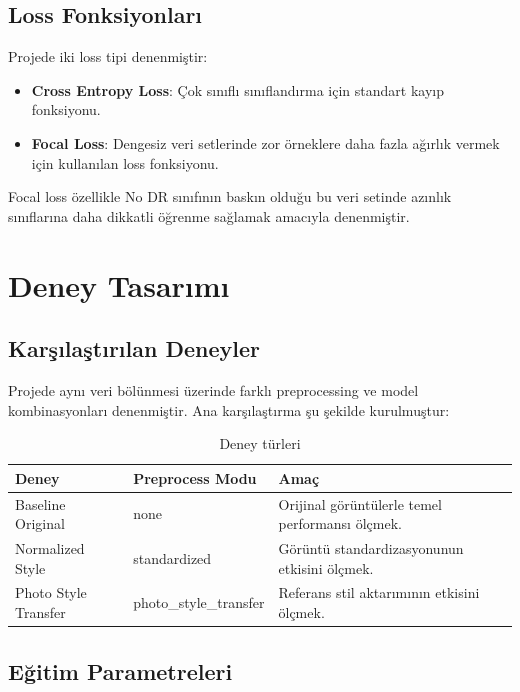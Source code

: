 \documentclass[12pt,a4paper]{article}
\begin{document}
\subsection{Loss Fonksiyonları}

Projede iki loss tipi denenmiştir:

\begin{itemize}
    \item \textbf{Cross Entropy Loss}: Çok sınıflı sınıflandırma için standart kayıp fonksiyonu.
    \item \textbf{Focal Loss}: Dengesiz veri setlerinde zor örneklere daha fazla ağırlık vermek için kullanılan loss fonksiyonu.
\end{itemize}

Focal loss özellikle No DR sınıfının baskın olduğu bu veri setinde azınlık sınıflarına daha dikkatli öğrenme sağlamak amacıyla denenmiştir.



\section{Deney Tasarımı}

\subsection{Karşılaştırılan Deneyler}

Projede aynı veri bölünmesi üzerinde farklı preprocessing ve model kombinasyonları denenmiştir. Ana karşılaştırma şu şekilde kurulmuştur:

\begin{table}[H]
\centering
\caption{Deney türleri}
\begin{tabular}{lll}
\toprule
\textbf{Deney} & \textbf{Preprocess Modu} & \textbf{Amaç} \\
\midrule
Baseline Original & none & Orijinal görüntülerle temel performansı ölçmek. \\
Normalized Style & standardized & Görüntü standardizasyonunun etkisini ölçmek. \\
Photo Style Transfer & photo\_style\_transfer & Referans stil aktarımının etkisini ölçmek. \\
\bottomrule
\end{tabular}
\end{table}

\subsection{Eğitim Parametreleri}
\end{document}
